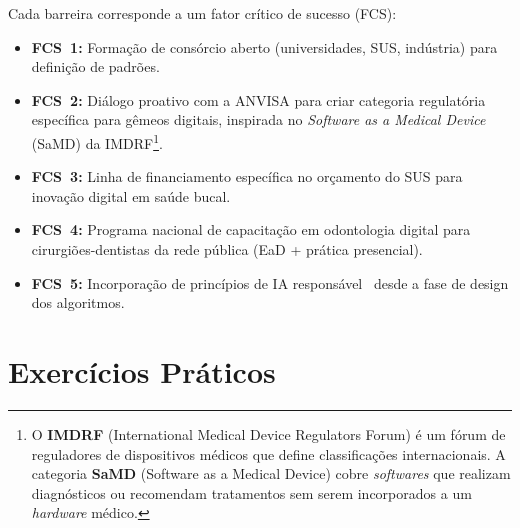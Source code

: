 Cada barreira corresponde a um fator crítico de sucesso (FCS):
\begin{itemize}
    \item \textbf{FCS~1:} Formação de consórcio aberto
        (universidades, SUS, indústria) para definição de padrões.
    \item \textbf{FCS~2:} Diálogo proativo com a ANVISA para
        criar categoria regulatória específica para gêmeos
        digitais, inspirada no \textit{Software as a Medical
        Device} (SaMD) da IMDRF\footnote{O \textbf{IMDRF}
        (International Medical Device Regulators Forum) é um
        fórum de reguladores de dispositivos médicos que define
        classificações internacionais. A categoria \textbf{SaMD}
        (Software as a Medical Device) cobre \textit{softwares}
        que realizam diagnósticos ou recomendam tratamentos sem
        serem incorporados a um \textit{hardware} médico.}.
    \item \textbf{FCS~3:} Linha de financiamento específica no
        orçamento do SUS para inovação digital em saúde bucal.
    \item \textbf{FCS~4:} Programa nacional de capacitação em
        odontologia digital para cirurgiões-dentistas da rede
        pública (EaD + prática presencial).
    \item \textbf{FCS~5:} Incorporação de princípios de IA
        responsável~\cite{springer2026realising} desde a fase de
        design dos algoritmos.
\end{itemize}


\section{Exercícios Práticos}

